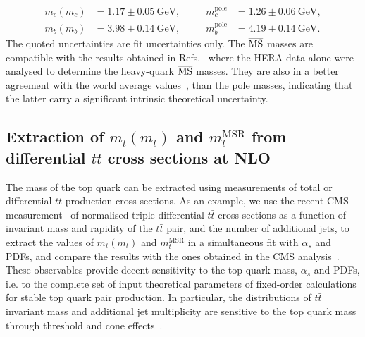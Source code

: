 \documentclass[12pt,a4paper]{article}
\newcommand{\msbar}{\ensuremath{\overline{\rm MS}}\xspace}
\newcommand{\msbarm}[1][]{\ensuremath{m_{#1}(m_{#1})}\xspace}
\newcommand{\msrm}[1][]{\ensuremath{m_{#1}^{\text{MSR}}}\xspace}
\begin{document}
\begin{equation}
\begin{aligned}
m_c(m_c) &= 1.17 \pm 0.05~\textrm{GeV},~~~~~~~~ &m_c^{\textrm{pole}} &= 1.26 \pm 0.06 ~\textrm{GeV},\\
m_b(m_b) &= 3.98 \pm 0.14 ~\textrm{GeV},~~~~~~~~ &m_b^{\textrm{pole}} &= 4.19 \pm 0.14 ~\textrm{GeV}.
\end{aligned}
\label{eq:dztocc}
\end{equation}
The quoted uncertainties are fit uncertainties only.
The \msbar masses are compatible with the results obtained in Refs.~\cite{Abramowicz:1900rp,Abramowicz:2014zub,Bertone:2016ywq,H1:2018flt} where the HERA data alone were analysed to determine the heavy-quark \msbar masses. They are also in a better agreement with the world average values~\cite{Tanabashi:2018oca}, than the pole masses, indicating that the latter carry a significant intrinsic theoretical uncertainty.

%
\subsection{Extraction of \msbarm[t] and \msrm[t] from differential $t\bar{t}$ cross sections at NLO}
The mass of the top quark can be extracted using measurements of total or differential $t\bar{t}$ production cross sections. As an example, we use the recent CMS measurement~\cite{Sirunyan:2019zvx} of normalised triple-differential $t\bar{t}$ cross sections as a function of invariant mass and rapidity of the $t\bar{t}$ pair, and the number of additional jets, to extract the values of \msbarm[t] and \msrm[t] in a simultaneous fit with $\alpha_s$ and PDFs, and compare the results with the ones obtained in the CMS analysis~\cite{Sirunyan:2019zvx}. These observables provide decent sensitivity to the top quark mass, $\alpha_s$ and PDFs, i.e. to the complete set of input theoretical parameters of fixed-order calculations for stable top quark pair production. In particular, the distributions of $t\bar{t}$ invariant mass and additional jet multiplicity are sensitive to the top quark mass through threshold and cone effects~\cite{Alioli:2013mxa}.
\end{document}
